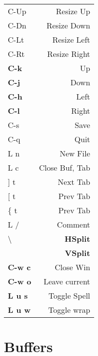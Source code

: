 \documentclass[
  ,landscape
  ,columns=4
]{cheatsheet}
\begin{document}
\begin{tabular}{l>{\color{black}}r}
	C-Up           & Resize Up       \\
	C-Dn           & Resize Down     \\
	C-Lt           & Resize Left     \\
	C-Rt           & Resize Right    \\
	\textbf{C-k}   & Up              \\
	\textbf{C-j}   & Down            \\
	\textbf{C-h}   & Left            \\
	\textbf{C-l}   & Right           \\
	C-s            & Save            \\
	C-q            & Quit            \\
	L n            & New File        \\
	L c            & Close Buf, Tab  \\
	{]} t          & Next Tab        \\
	{[} t          & Prev Tab        \\
	\{ t           & Prev Tab        \\
	L /            & Comment         \\
	\textbackslash & \textbf{HSplit} \\
	\textbar       & \textbf{VSplit} \\
	\textbf{C-w c} & Close Win       \\
	\textbf{C-w o} & Leave current   \\
	\textbf{L u s} & Toggle Spell    \\
	\textbf{L u w} & Toggle wrap     \\
\end{tabular}

\section{Buffers}
\end{document}
